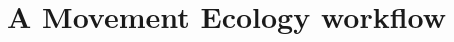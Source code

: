 \documentclass[a4paper,12pt]{article}
\begin{document}
\newpage


\section*{A Movement Ecology workflow}
%
\end{document}
